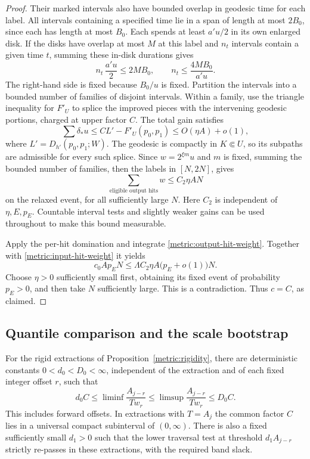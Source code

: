 \begin{proof}
Their marked intervals also have bounded overlap in geodesic time for
each label. All intervals containing a specified time lie in a span of
length at most $2B_0$, since each has length at most $B_0$. Each spends
at least \(a'u/2\) in its own enlarged disk. If the disks have overlap
at most \(M\) at this label and \(n_t\) intervals contain a given
time \(t\), summing these in-disk durations gives
\[
 n_t\,\frac{a'u}{2}\le 2M B_0,
 \qquad n_t\le\frac{4M B_0}{a'u}.
\]
The right-hand side is fixed because \(B_0/u\) is fixed. Partition the intervals into a bounded number of
families of disjoint intervals. Within a family, use the triangle
inequality for $F'_U$ to splice the improved pieces with the intervening
geodesic portions, charged at upper factor $C$. The total gain satisfies
\[
 \sum\delta_*u\le C L'-F'_U(p_0,p_1)
 \le O(\eta A)+o(1),
\]
where $L'=D_{h'}(p_0,p_1;W)$. The geodesic is compactly in $K\Subset U$,
so its subpaths are admissible for every such splice. Since
$w=2^{\xi m}u$ and $m$ is fixed, summing the bounded number of families,
then the labels in $[N,2N]$, gives
\begin{equation}\label{metric:output-hit-weight}
 \sum_{\text{eligible output hits}}w\le C_2\eta A N
\end{equation}
on the relaxed event, for all sufficiently large $N$. Here $C_2$ is
independent of $\eta,E,p_E$. Countable interval tests and slightly weaker
gains can be used throughout to make this bound measurable.

Apply the per-hit domination and integrate
\eqref{metric:output-hit-weight}. Together with
\eqref{metric:input-hit-weight} it yields
\[
 c_0A p_E N\le \Lambda C_2\eta A\bigl(p_E+o(1)\bigr)N.
\]
Choose $\eta>0$ sufficiently small first, obtaining its fixed event of
probability $p_E>0$, and then take $N$ sufficiently large. This is a
contradiction. Thus $c=C$, as claimed.
\end{proof}

\subsection{Quantile comparison and the scale bootstrap}

\begin{lemma}\label{metric:rigid-quantiles}
For the rigid extractions of Proposition~\ref{metric:rigidity}, there
are deterministic constants $0<d_0<D_0<\infty$, independent of the
extraction and of each fixed integer offset $r$, such that
\begin{equation}\label{eq:original-17}
 d_0C\le\liminf\frac{A_{j-r}}{Tw_r}
 \le\limsup\frac{A_{j-r}}{Tw_r}\le D_0C.
\end{equation}
This includes forward offsets. In extractions with $T=A_j$ the common
factor $C$ lies in a universal compact subinterval of $(0,\infty)$.
There is also a fixed sufficiently small $d_1>0$ such that the lower
traversal test at threshold $d_1A_{j-r}$ strictly re-passes in these
extractions, with the required band slack.
\end{lemma}

